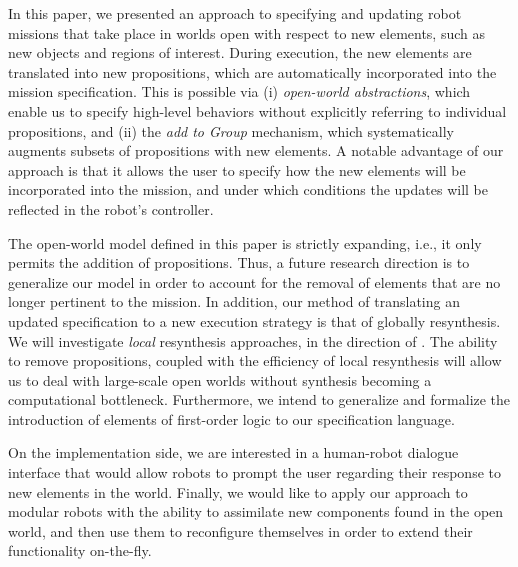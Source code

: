 In this paper, we presented an approach to specifying and updating robot missions that take place in worlds open with respect to new elements, such as new objects and regions of interest. During execution, the new elements are translated into new propositions, which are automatically incorporated into the mission specification. This is possible via (i) \emph{open-world abstractions}, which enable us to specify high-level behaviors without explicitly referring to individual propositions, and (ii) the \emph{add to Group} mechanism, which systematically augments subsets of propositions with new elements. A notable advantage of our approach is that it allows the user to specify how the new elements will be incorporated into the mission, and under which conditions the updates will be reflected in the robot's controller.

The open-world model defined in this paper is strictly expanding, i.e., it only permits the addition of propositions. Thus, a future research direction is to generalize our model in order to account for the removal of elements that are no longer pertinent to the mission. 
In addition, our method of translating an updated specification to a new execution strategy is that of globally resynthesis. We will investigate \emph{local} resynthesis approaches, in the direction of \cite{MurrayICRA2012, MurrayICRA2013a}.
The ability to remove propositions, coupled with the efficiency of local resynthesis will allow us to deal with large-scale open worlds without synthesis becoming a computational bottleneck.
Furthermore, we intend to generalize and formalize the introduction of elements of first-order logic to our specification language.

On the implementation side, we are interested in a human-robot dialogue interface that would allow robots to prompt the user regarding their response to new elements in the world.
Finally, we would like to apply our approach to modular robots \cite{ModularIROS2011} with the ability to assimilate new components found in the open world, and then use them to reconfigure themselves in order to extend their functionality on-the-fly.
